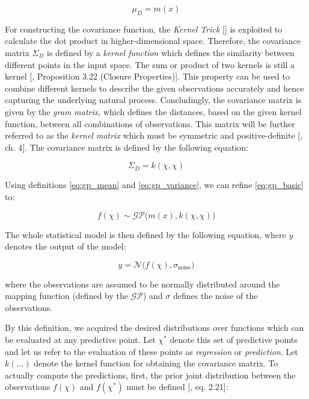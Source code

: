 \documentclass[11pt]{scrartcl}
\begin{document}
\begin{equation}
\label{eq:gp_mean}
    \mu_D = m(x)
\end{equation}

For constructing the covariance function, the \textit{Kernel Trick} [\cite{10.5555/3008751.3008793}] is exploited to calculate the dot product in higher-dimensional space. Therefore, the covariance matrix $\Sigma_D$ is defined by a \textit{kernel function} which defines the similarity between different points in the input space. The sum or product of two kernels is still a kernel [\cite{shawe-taylor_cristianini_2004}, Proposition 3.22 (Closure Properties)]. This property can be used to combine different kernels to describe the given observations accurately and hence capturing the underlying natural process. Concludingly, the covariance matrix is given by the \textit{gram matrix}, which defines the distances, based on the given kernel function, between all combinations of observations. This matrix will be further referred to as the \textit{kernel matrix} which must be symmetric and positive-definite [\cite{10.5555/1162254}, ch. 4]. The covariance matrix is defined by the following equation:

\begin{equation}
\label{eq:gp_variance}
    \Sigma_D = k(\chi, \chi)
\end{equation}

Using definitions \ref{eq:gp_mean} and \ref{eq:gp_variance}, we can refine \ref{eq:gp_basic} to:

\begin{equation}
    f(\chi) \sim \mathcal{GP}\big(m(x), k(\chi, \chi)\big)
\end{equation}

The whole statistical model is then defined by the following equation, where $y$ denotes the output of the model:

\begin{equation}
    y = \mathcal{N}\big(f(\chi), \sigma_{\text{noise}}\big)
\end{equation}

where the observations are assumed to be normally distributed around the mapping function (defined by the $\mathcal{GP}$) and $\sigma$ defines the noise of the observations. 

By this definition, we acquired the desired distributions over functions which can be evaluated at any predictive point. Let $\chi^\ast$ denote this set of predictive points and let us refer to the evaluation of these points as \textit{regression} or \textit{prediction}. Let $k(...)$ denote the kernel function for obtaining the covariance matrix. To actually compute the predictions, first, the prior joint distribution between the observations $f(\chi)$ and $f(\chi^\ast)$ must be defined [\cite{10.5555/1162254}, eq. 2.21]:
\end{document}
